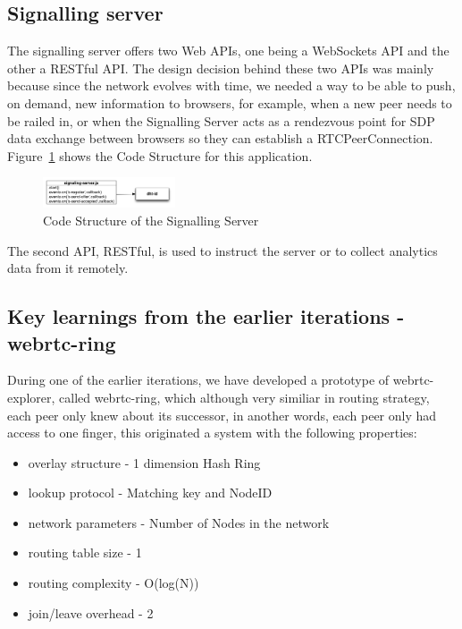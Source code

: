 \subsection{Signalling server}

The signalling server offers two Web APIs, one being a WebSockets API and the other a RESTful API. The design decision behind these two APIs was mainly because since the network evolves with time, we needed a way to be able to push, on demand, new information to browsers, for example, when a new peer needs to be railed in, or when the Signalling Server acts as a rendezvous point for SDP data exchange between browsers so they can establish a RTCPeerConnection. Figure~\ref{fig:d-s-s} shows the Code Structure for this application.

\begin{figure}[h!]
  \centering
  \includegraphics[width=0.35\textwidth]{figs/diagram-signalling-server}
  \caption{Code Structure of the Signalling Server}
  \label{fig:d-s-s}
\end{figure}

The second API, RESTful, is used to instruct the server or to collect analytics data from it remotely.

\subsection{Key learnings from the earlier iterations - webrtc-ring}

During one of the earlier iterations, we have developed a prototype of webrtc-explorer, called webrtc-ring, which although very similiar in routing strategy, each peer only knew about its successor, in another words, each peer only had access to one finger, this originated a system with the following properties:

\begin{itemize}
    \item overlay structure - 1 dimension Hash Ring
    \item lookup protocol - Matching key and NodeID
    \item network parameters - Number of Nodes in the network
    \item routing table size - 1
    \item routing complexity - O(log(N))
    \item join/leave overhead - 2
\end{itemize}

